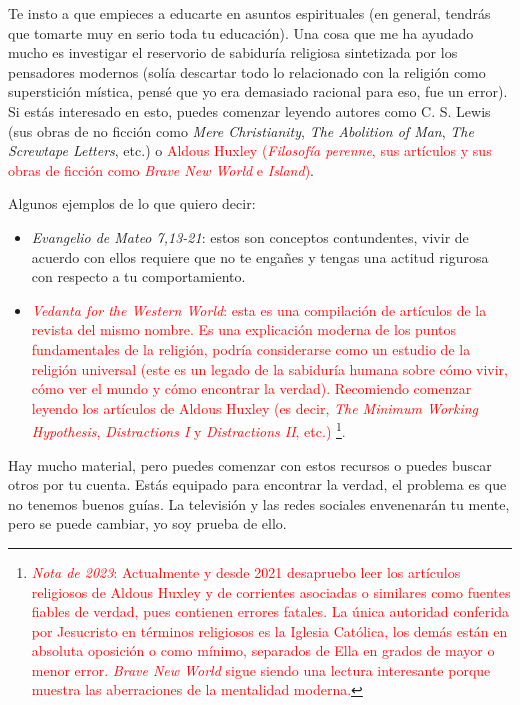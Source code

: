 \documentclass[12pt]{article}
\begin{document}
	Te insto a que empieces a educarte en asuntos espirituales (en general,
	tendrás que tomarte muy en serio toda tu educación). Una cosa que me ha
	ayudado mucho es investigar el reservorio de sabiduría religiosa
	sintetizada por los pensadores modernos (solía descartar todo lo
	relacionado con la religión como superstición mística, pensé que yo era
	demasiado racional para eso, fue un error). Si estás interesado en esto,
	puedes comenzar leyendo autores como C. S. Lewis (sus obras de no
	ficción como \textit{Mere Christianity}, \textit{The Abolition of Man},
	\textit{The Screwtape Letters}, etc.) o \textcolor{red}{Aldous Huxley
	(\textit{Filosofía perenne}, sus artículos y sus obras de ficción
	como \textit{Brave New World} e \textit{Island})}.


	Algunos ejemplos de lo que quiero decir:

	\begin{itemize}

	\item \textit{Evangelio de Mateo 7,13-21}:
	estos son conceptos contundentes, vivir de acuerdo con ellos requiere
	que no te engañes y tengas una actitud rigurosa con respecto a tu
	comportamiento.

	\item \textcolor{red}{\textit{Vedanta for the Western World}: esta
	es una compilación de artículos de la revista del mismo nombre. Es una
	explicación moderna de los puntos fundamentales de la religión,
	podría considerarse como un estudio de la religión universal (este es un
	legado de la sabiduría humana sobre cómo vivir, cómo ver el mundo y cómo
	encontrar la verdad). Recomiendo comenzar leyendo los artículos de
	Aldous Huxley (es decir, \textit{The Minimum Working Hypothesis},
	\textit{Distractions I} y \textit{Distractions II}, etc.)
	\footnote{\textcolor{red}{
		\textit{Nota de 2023}: Actualmente y desde 2021 desapruebo leer
			los artículos
	religiosos de
	Aldous Huxley y de corrientes asociadas o similares como fuentes
	fiables de verdad, pues contienen errores fatales. La única autoridad
	conferida por Jesucristo en términos religiosos es la Iglesia
	Católica, los demás  están en absoluta oposición o
	como mínimo, separados de Ella en grados de mayor o menor error.
	\textit{Brave New World} sigue siendo una lectura interesante porque
	muestra las aberraciones de la mentalidad moderna.}}.}
	\end{itemize}

	Hay mucho material, pero puedes comenzar con estos recursos o puedes
	buscar otros por tu cuenta. Estás equipado para encontrar la verdad, el
	problema es que no tenemos buenos guías. La televisión y las redes
	sociales envenenarán tu mente, pero se puede cambiar, yo soy prueba de
	ello.
\end{document}
